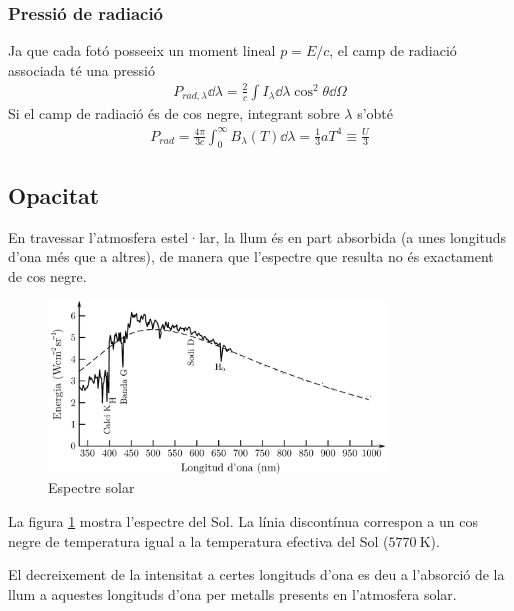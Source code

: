 \subsubsection*{Pressió de radiació}
\begin{defi}
	Ja que cada fotó posseeix un moment lineal $p = E/c$, el camp de radiació associada té una pressió
	\begin{align}
		P_{rad,\lambda} \dd{\lambda} = \frac{2}{c} \int I_{\lambda} \dd{\lambda} \cos^{2} \theta \dd{\Omega}
	\end{align}
	Si el camp de radiació és de cos negre, integrant sobre $\lambda$ s'obté
	\begin{align}
		P_{rad} = \frac{4\pi}{3c} \int_{0}^{\infty} B_{\lambda}(T) \dd{\lambda} = \frac{1}{3} a T^{4} \equiv \frac{U}{3}
	\end{align}
\end{defi}

\subsection{Opacitat}
En travessar l'atmosfera estel·lar, la llum és en part absorbida (a unes longituds d'ona més que a altres), de manera que l'espectre que resulta no és exactament de cos negre.
\begin{figure}[H]
	\centering
	\includegraphics[width=0.8\textwidth]{./images/4-espectre-solar}
	\caption{Espectre solar}
	\label{fig:espectre-solar}
\end{figure}

La figura \ref{fig:espectre-solar} mostra l'espectre del Sol. La línia discontínua correspon a un cos negre de temperatura igual a la temperatura efectiva del Sol ($\SI{5770}{\K}$).

El decreixement de la intensitat a certes longituds d'ona es deu a l'absorció de la llum a aquestes longituds d'ona per metalls presents en l'atmosfera solar.

